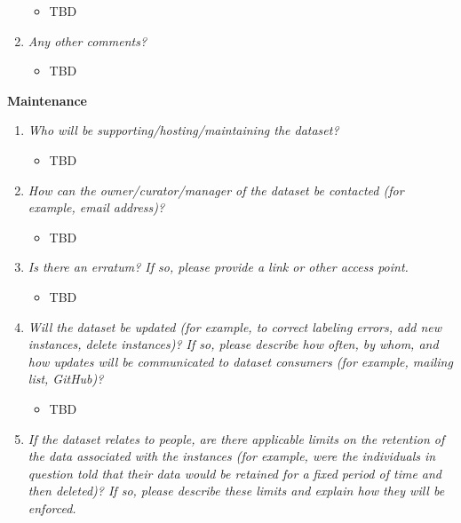 \documentclass[
  letterpaper,
  DIV=11,
  numbers=noendperiod]{scrartcl}
\providecommand{\tightlist}{%
  \setlength{\itemsep}{0pt}\setlength{\parskip}{0pt}}\usepackage{longtable,booktabs,array}
\begin{document}
\begin{enumerate}
  \begin{itemize}
  \tightlist
  \item
    TBD
  \end{itemize}
\item
  \emph{Any other comments?}

  \begin{itemize}
  \tightlist
  \item
    TBD
  \end{itemize}
\end{enumerate}

\textbf{Maintenance}

\begin{enumerate}
\def\labelenumi{\arabic{enumi}.}
\tightlist
\item
  \emph{Who will be supporting/hosting/maintaining the dataset?}

  \begin{itemize}
  \tightlist
  \item
    TBD
  \end{itemize}
\item
  \emph{How can the owner/curator/manager of the dataset be contacted
  (for example, email address)?}

  \begin{itemize}
  \tightlist
  \item
    TBD
  \end{itemize}
\item
  \emph{Is there an erratum? If so, please provide a link or other
  access point.}

  \begin{itemize}
  \tightlist
  \item
    TBD
  \end{itemize}
\item
  \emph{Will the dataset be updated (for example, to correct labeling
  errors, add new instances, delete instances)? If so, please describe
  how often, by whom, and how updates will be communicated to dataset
  consumers (for example, mailing list, GitHub)?}

  \begin{itemize}
  \tightlist
  \item
    TBD
  \end{itemize}
\item
  \emph{If the dataset relates to people, are there applicable limits on
  the retention of the data associated with the instances (for example,
  were the individuals in question told that their data would be
  retained for a fixed period of time and then deleted)? If so, please
  describe these limits and explain how they will be enforced.}


\end{enumerate}
\end{document}
